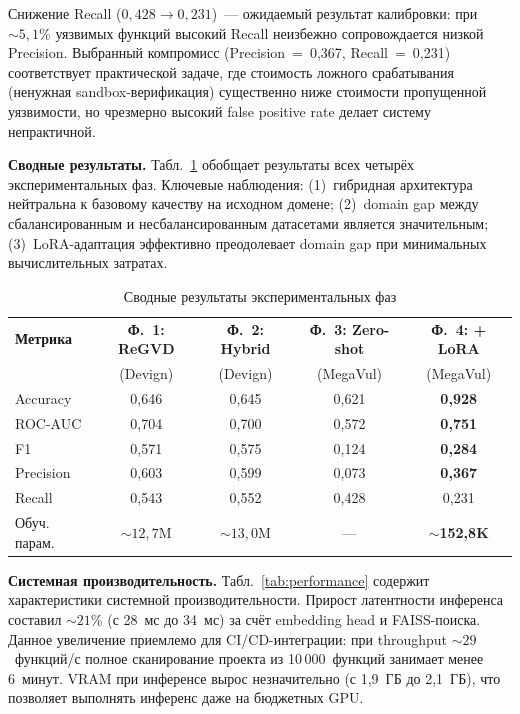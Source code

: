 \documentclass[runningheads]{llncs}
\begin{document}
Снижение Recall ($0{,}428 \to 0{,}231$)~--- ожидаемый результат калибровки: при ${\sim}5{,}1$\% уязвимых функций высокий Recall неизбежно сопровождается низкой Precision. Выбранный компромисс (Precision~=~0,367, Recall~=~0,231) соответствует практической задаче, где стоимость ложного срабатывания (ненужная sandbox-верификация) существенно ниже стоимости пропущенной уязвимости, но чрезмерно высокий false positive rate делает систему непрактичной.

\textbf{Сводные результаты.}
Табл.~\ref{tab:summary} обобщает результаты всех четырёх экспериментальных фаз. Ключевые наблюдения: (1)~гибридная архитектура нейтральна к базовому качеству на исходном домене; (2)~domain gap между сбалансированным и несбалансированным датасетами является значительным; (3)~LoRA-адаптация эффективно преодолевает domain gap при минимальных вычислительных затратах.

\begin{table}
\centering
\caption{Сводные результаты экспериментальных фаз}
\label{tab:summary}
\small
\begin{tabular}{|l|*{4}{c|}}
\hline
\textbf{Метрика} & \textbf{Ф.~1: ReGVD} & \textbf{Ф.~2: Hybrid} & \textbf{Ф.~3: Zero-shot} & \textbf{Ф.~4: + LoRA} \\
& \footnotesize (Devign) & \footnotesize (Devign) & \footnotesize (MegaVul) & \footnotesize (MegaVul) \\
\hline
Accuracy & 0,646 & 0,645 & 0,621 & \textbf{0,928} \\
ROC-AUC & 0,704 & 0,700 & 0,572 & \textbf{0,751} \\
F1 & 0,571 & 0,575 & 0,124 & \textbf{0,284} \\
Precision & 0,603 & 0,599 & 0,073 & \textbf{0,367} \\
Recall & 0,543 & 0,552 & 0,428 & 0,231 \\
Обуч. парам. & ${\sim}12{,}7$M & ${\sim}13{,}0$M & --- & ${\sim}$\textbf{152,8K} \\
\hline
\end{tabular}
\end{table}

\textbf{Системная производительность.}
Табл.~\ref{tab:performance} содержит характеристики системной производительности. Прирост латентности инференса составил ${\sim}21$\% (с 28~мс до 34~мс) за счёт embedding head и FAISS-поиска. Данное увеличение приемлемо для CI/CD-интеграции: при throughput ${\sim}29$~функций/с полное сканирование проекта из 10\,000~функций занимает менее 6~минут. VRAM при инференсе вырос незначительно (с 1,9~ГБ до 2,1~ГБ), что позволяет выполнять инференс даже на бюджетных GPU.
\end{document}
